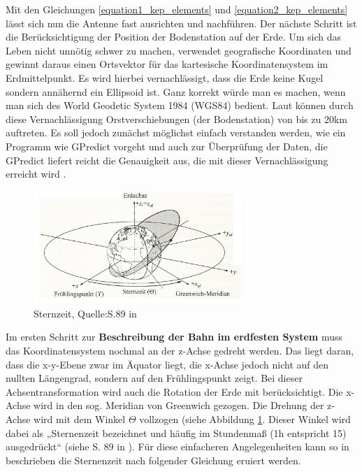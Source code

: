 Mit den Gleichungen \ref{equation1_kep_elements} und \ref{equation2_kep_elements} lässt sich nun die Antenne fast ausrichten und nachführen. Der nächste Schritt ist die Berücksichtigung der Position der Bodenstation auf der Erde. Um sich das Leben nicht unnötig schwer zu machen, verwendet geografische Koordinaten und gewinnt daraus einen Ortsvektor für das kartesische Koordinatensystem im Erdmittelpunkt. Es wird hierbei vernachlässigt, dass die Erde keine Kugel sondern annähernd ein Ellipsoid ist. Ganz korrekt würde man es machen, wenn man sich des World Geodetic System 1984 (WGS84) bedient. Laut \cite{Wiki:Geo} können durch diese Vernachlässigung Orstverschiebungen (der Bodenstation) von bis zu 20km auftreten. Es soll jedoch zunächst möglichst einfach verstanden werden, wie ein Programm wie GPredict vorgeht und auch zur Überprüfung der Daten, die GPredict liefert reicht die Genauigkeit aus, die mit dieser Vernachlässigung erreicht wird .
\begin{figure}[h]                                                                           %
	\centering                                                                            	%
	\includegraphics[width=0.7\textwidth]{./images/startime.jpg}                    		%
	\caption[Sternzeit]{Sternzeit, Quelle:S.89 in \cite{HandRaum}}                          %
	\label{fig:startime}                                                                	%
\end{figure}                                                                              	%
Im ersten Schritt zur  \textbf{Beschreibung der Bahn im erdfesten System} muss das Koordinatensystem nochmal an der z-Achse gedreht werden. Das liegt daran, dass die x-y-Ebene zwar im Äquator liegt, die x-Achse jedoch nicht auf den nullten Längengrad, sondern auf den Frühlingspunkt zeigt. Bei dieser Achsentransformation wird auch die Rotation der Erde mit berücksichtigt. Die x-Achse wird in den sog. Meridian von Greenwich gezogen. Die Drehung der z-Achse wird mit dem Winkel \ensuremath{\Theta} vollzogen (siehe Abbildung \ref{fig:startime}. Dieser Winkel wird dabei als „Sternenzeit bezeichnet und häufig im Stundenmaß (1h entspricht 15\degree) ausgedrückt“ (siehe S. 89 in \cite{HandRaum}). Für diese einfacheren Angelegenheiten kann so in \cite{HandRaum} beschrieben die Sternenzeit nach folgender Gleichung eruiert werden.
